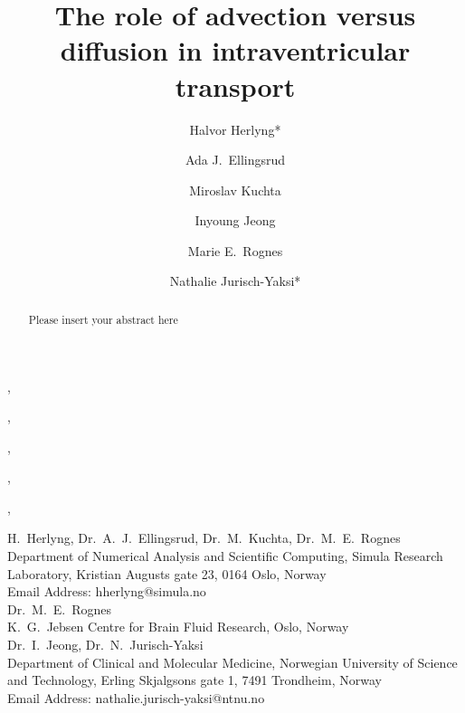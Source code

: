 \documentclass{WileyMSP-template}
\begin{document}
\pagestyle{plain} %

\title{The role of advection versus diffusion in intraventricular transport}
%
\maketitle
%
%
\author{Halvor Herlyng*},
\author{Ada J.~Ellingsrud},
\author{Miroslav Kuchta},
\author{Inyoung Jeong},
\author{Marie E.~Rognes}, 
\author{Nathalie Jurisch-Yaksi*}

\begin{affiliations}
\noindent H.~Herlyng, Dr.~A.~J.~Ellingsrud, Dr.~M.~Kuchta, Dr.~M.~E.~Rognes\\
Department of Numerical Analysis and Scientific Computing,
Simula Research Laboratory, Kristian Augusts gate 23, 0164 Oslo, Norway\\
Email Address: hherlyng@simula.no \\ 
Dr.~M.~E.~Rognes \\
K.~G.~Jebsen Centre for Brain Fluid Research, Oslo, Norway \\
Dr.~I.~Jeong, Dr.~N.~Jurisch-Yaksi\\
Department of Clinical and Molecular Medicine,
Norwegian University of Science and Technology, Erling Skjalgsons gate 1, 7491 Trondheim, Norway \\
Email Address: nathalie.jurisch-yaksi@ntnu.no

\end{affiliations}




\begin{abstract}

Please insert your abstract here

\end{abstract}

\end{document}
